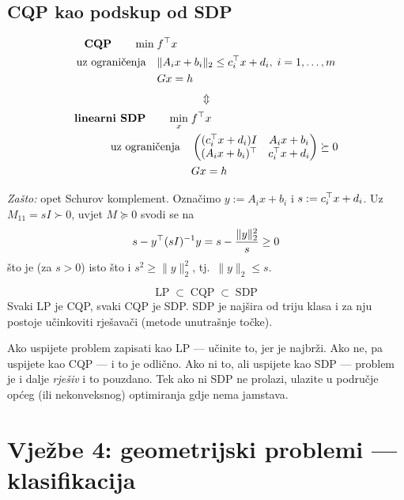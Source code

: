 \subsection{CQP kao podskup od SDP}

\[
\begin{aligned}
\text{\textbf{CQP}} \qquad
\min \; & f\T x \\
\uzogr & \|A_ix + b_i\|_2 \le c_i\T x + d_i, \; i = 1,\dots,m \\
& Gx = h
\end{aligned}
\]
\[
\Updownarrow
\]
\[
\begin{aligned}
\text{\textbf{linearni SDP}} \qquad
\min_x \; & f\T x \\
\uzogr & \begin{pmatrix}
(c_i\T x + d_i)I & A_ix + b_i \\
(A_ix + b_i)\T & c_i\T x + d_i
\end{pmatrix} \succeq 0 \\
& Gx = h
\end{aligned}
\]

\emph{Zašto:} opet Schurov komplement. Označimo $y := A_ix + b_i$ i
$s := c_i\T x + d_i$. Uz $M_{11} = sI \succ 0$, uvjet $M \succeq 0$ svodi se na
\[
s - y\T(sI)^{-1}y = s - \frac{\|y\|_2^2}{s} \ge 0
\]
što je (za $s > 0$) isto što i $s^2 \ge \|y\|_2^2$, tj.\ $\|y\|_2 \le s$.
\checkmark

\begin{teorem}[Zaključak]
\[
\text{LP} \;\subset\; \text{CQP} \;\subset\; \text{SDP}
\]
Svaki LP je CQP, svaki CQP je SDP. SDP je najšira od triju klasa i za nju
postoje učinkoviti rješavači (metode unutrašnje točke).
\end{teorem}

\begin{napomena}
Ako uspijete problem zapisati kao LP --- učinite to, jer je najbrži. Ako ne, pa
uspijete kao CQP --- i to je odlično. Ako ni to, ali uspijete kao SDP --- problem
je i dalje \emph{rješiv} i to pouzdano. Tek ako ni SDP ne prolazi, ulazite u
područje općeg (ili nekonveksnog) optimiranja gdje nema jamstava.
\end{napomena}

\section{Vježbe 4: geometrijski problemi --- klasifikacija}
\label{sec:klasifikacija}

